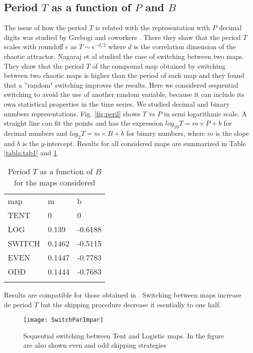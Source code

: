 \subsection{Period $T$ as a function of $P$ and $B$}
The issue of how the period $T$ is related with the representation with $P$ decimal digits was studied by Grebogi and coworkers \cite{Grebogi1988}. There they shaw that the period $T$ scales with roundoff $\epsilon$ as
$T\sim\epsilon^{-d/2}$ where $d$ is the correlation dimension of
the chaotic attractor. Nagaraj et al \cite{Nagaraj2008} studied the case of switching between two maps. They shaw that the period $T$ of the
compound map obtained by switching between two chaotic maps is
higher than the period of each map and they found that a ''random" switching improves the results. Here we considered  sequential switching to avoid the use of another random variable, because it can include its own statistical properties in the time series. We studied decimal and binary numbers representations. Fig. \ref{fig:peril} shows  $T$ vs $P$ in semi logarithmic scale. 
A straight line can fit the points and has the expression  $log_{10}T=m \times P + b$ for decimal numbers and  $log_{2}T=m \times B + b$ for binary numbers, where $m$ is the slope and $b$ is the $y$-intercept. Results for all considered maps are summarized in Table \ref{tabla:tab1} and \ref{tabla:tab2}.

\begin{table}
\caption{Period $T$ as a function of $B$ for the maps considered}
\label{tabla:tab2}       %
\begin{tabular}{lll}
\hline\noalign{\smallskip}
map & m & b  \\
\noalign{\smallskip}\hline\noalign{\smallskip}
TENT&0 & 0 \\
LOG &0.139 & -0.6188 \\
SWITCH &0.1462 & -0.5115 \\
EVEN &0.1447 & -0.7783 \\
ODD &0.1444 & -0.7683 \\
\noalign{\smallskip}\hline
\end{tabular}
\end{table}
Results are compatible for those obtained in \cite{Nagaraj2008}. Switching between maps increase de period $T$ but the skipping procedure decrease it esentially to one half. 

\begin{figure}
	\texttt{[image: SwitchParImpar]}
	\caption{Sequential switching between Tent and Logistic maps. In the figure are also shown even and odd skipping strategies} \label{fig:seq}
\end{figure}
